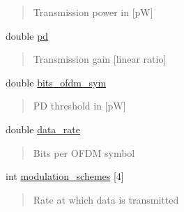 \begin{DoxyCompactItemize}
\begin{DoxyCompactList}
\begin{quote}
Transmission power in \mbox{[}pW\mbox{]} \end{quote}
\end{DoxyCompactList}\item 
\mbox{\label{structTxInfo_a09dccaedd762a1596e58e488627da08d}} 
double \hyperlink{structTxInfo_a09dccaedd762a1596e58e488627da08d}{pd}
\begin{DoxyCompactList}\small\item\em \begin{quote}
Transmission gain \mbox{[}linear ratio\mbox{]} \end{quote}
\end{DoxyCompactList}\item 
\mbox{\label{structTxInfo_a6d2703daa80a27ff6357659965da60cb}} 
double \hyperlink{structTxInfo_a6d2703daa80a27ff6357659965da60cb}{bits\+\_\+ofdm\+\_\+sym}
\begin{DoxyCompactList}\small\item\em \begin{quote}
PD threshold in \mbox{[}pW\mbox{]} \end{quote}
\end{DoxyCompactList}\item 
\mbox{\label{structTxInfo_acb8b302a81b008eba26c6fe5107f1884}} 
double \hyperlink{structTxInfo_acb8b302a81b008eba26c6fe5107f1884}{data\+\_\+rate}
\begin{DoxyCompactList}\small\item\em \begin{quote}
Bits per O\+F\+DM symbol \end{quote}
\end{DoxyCompactList}\item 
\mbox{\label{structTxInfo_a521fea6991c383e0db4cdfbbd11c4840}} 
int \hyperlink{structTxInfo_a521fea6991c383e0db4cdfbbd11c4840}{modulation\+\_\+schemes} \mbox{[}4\mbox{]}
\begin{DoxyCompactList}\small\item\em \begin{quote}
Rate at which data is transmitted \end{quote}
\end{DoxyCompactList}\item 
\mbox{\label{structTxInfo_af0f56f95bff10a32b0fc678520a2e0df}} 

\end{DoxyCompactItemize}
